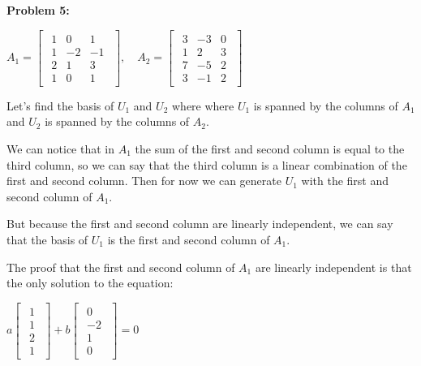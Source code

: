 \textbf{Problem 5:}

\singlespacing

\begin{math}
    A_1=\begin{bmatrix}
        \begin{array}{ccc}
            1 & 0  & 1  \\
            1 & -2 & -1 \\
            2 & 1  & 3  \\
            1 & 0  & 1
        \end{array}
    \end{bmatrix},\quad
    A_2=\begin{bmatrix}
        \begin{array}{ccc}
            3 & -3 & 0 \\
            1 & 2  & 3 \\
            7 & -5 & 2 \\
            3 & -1 & 2
        \end{array}
    \end{bmatrix}
\end{math}

\singlespacing
\singlespacing

Let's find the basis of $U_1$ and $U_2$ where where $U_1$ is spanned by the columns
of $A_1$ and $U_2$ is spanned by the columns of $A_2$.

\singlespacing

We can notice that in $A_1$ the sum of the first and second column is equal to the
third column, so we can say that the third column is a linear combination of the
first and second column. Then for now we can generate $U_1$ with the first and
second column of $A_1$.

\singlespacing

But because the first and second column are linearly independent, we can say that
the basis of $U_1$ is the first and second column of $A_1$.

\singlespacing

The proof that the first and second column of $A_1$ are linearly independent is
that the only solution to the equation:

\singlespacing

\begin{math}
    a \begin{bmatrix}
        \begin{array}{c}
            1 \\
            1 \\
            2 \\
            1
        \end{array}
    \end{bmatrix}
    +b \begin{bmatrix}
        \begin{array}{c}
            0  \\
            -2 \\
            1  \\
            0
        \end{array}
    \end{bmatrix}
    = 0
\end{math}

